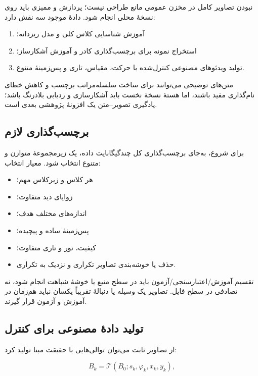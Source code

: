 \documentclass[12pt,a4paper]{article}
\begin{document}
نبودن تصاویر کامل در مخزن عمومی مانع طراحی نیست؛ پردازش و ممیزی باید روی نسخهٔ محلی انجام شود. دادهٔ موجود سه نقش دارد:

\begin{enumerate}
    \item آموزش شناسایی کلاس کلی و مدل ریزدانه؛
    \item استخراج نمونه برای برچسب‌گذاری کادر و آموزش آشکارساز؛
    \item تولید ویدئوهای مصنوعی کنترل‌شده با حرکت، مقیاس، تاری و پس‌زمینهٔ متنوع.
\end{enumerate}

متن‌های توضیحی می‌توانند برای ساخت سلسله‌مراتب برچسب و کاهش خطای نام‌گذاری مفید باشند، اما هستهٔ نسخهٔ نخست باید آشکارسازی و ردیابی بلادرنگ باشد؛ یادگیری تصویر--متن یک افزونهٔ پژوهشی بعدی است.

\subsection{برچسب‌گذاری لازم}

برای شروع، به‌جای برچسب‌گذاری کل چندگیگابایت داده، یک زیرمجموعهٔ متوازن و متنوع انتخاب شود. معیار انتخاب:

\begin{itemize}
    \item هر کلاس و زیرکلاس مهم؛
    \item زوایای دید متفاوت؛
    \item اندازه‌های مختلف هدف؛
    \item پس‌زمینهٔ ساده و پیچیده؛
    \item کیفیت، نور و تاری متفاوت؛
    \item حذف یا خوشه‌بندی تصاویر تکراری و نزدیک به تکراری.
\end{itemize}

تقسیم آموزش/اعتبارسنجی/آزمون باید در سطح منبع یا خوشهٔ شباهت انجام شود، نه تصادفی در سطح فایل. تصاویر یک وسیله یا دنبالهٔ تقریباً یکسان نباید هم‌زمان در آموزش و آزمون قرار گیرند.

\subsection{تولید دادهٔ مصنوعی برای کنترل}

از تصاویر ثابت می‌توان توالی‌هایی با حقیقت مبنا تولید کرد:

\begin{equation}
B_k = \mathcal{T}(B_0; s_k,\varphi_k,x_k,y_k),
\end{equation}
\end{document}
